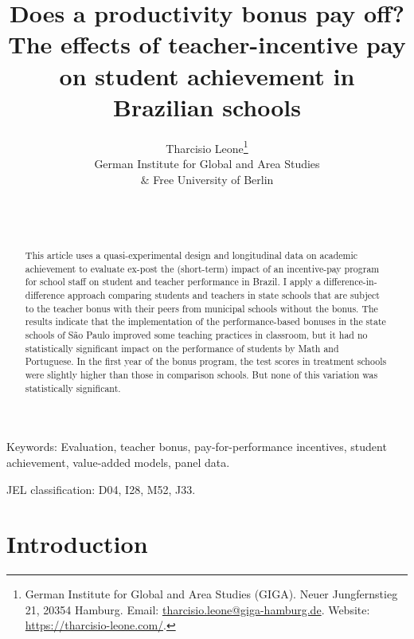 \documentclass[a4paper, 12pt]{article}
\title{Does a productivity bonus pay off? \\ \normalsize The effects of teacher-incentive pay on student achievement in Brazilian schools}
\author{Tharcisio Leone\thanks{German Institute for Global and Area Studies (GIGA). Neuer
Jungfernstieg 21, 20354 Hamburg. Email: \url{tharcisio.leone@giga-hamburg.de}. Website: \url{https://tharcisio-leone.com/}.} \\ \normalsize German Institute for Global and Area Studies \vspace{-6pt}\\ \normalsize $\&$ Free University of Berlin}
\date{\firstdraft \\ \thisdraft \\ \vspace{20pt} \thirddraft}
\let\ACMmaketitle=\maketitle
\renewcommand{\maketitle}{\begingroup\let\footnote=\thanks \ACMmaketitle\endgroup}
\begin{document}
\maketitle







\begin{abstract}
This article uses a quasi-experimental design and longitudinal data on academic achievement to evaluate ex-post the (short-term) impact of an incentive-pay program for school staff on student and teacher performance in Brazil. I apply a difference-in-difference approach comparing students and teachers in state schools that are subject to the teacher bonus with their peers from municipal schools without the bonus. The results indicate that the implementation of the performance-based bonuses in the state schools of São Paulo improved some teaching practices in classroom, but it had no statistically significant impact on the performance of students by Math and Portuguese. In the first year of the bonus program, the test scores in treatment schools were slightly higher than those in comparison schools. But none of this variation was statistically significant. 



\end{abstract}



\hfill \break 
\thispagestyle{empty}
Keywords: Evaluation, teacher bonus, pay-for-performance incentives, student achievement, value-added models, panel data. 

\hfill \break 
JEL classification: D04, I28, M52, J33.





\long{}



\newpage


\section{Introduction} \label{Paper3-Introduction}
\end{document}
